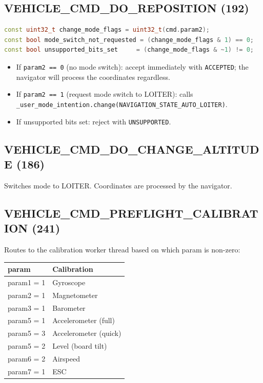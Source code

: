 \documentclass[12pt,a4paper]{article}
\begin{document}
\subsection{VEHICLE\_CMD\_DO\_REPOSITION (192)}

\begin{lstlisting}[language=C++]
const uint32_t change_mode_flags = uint32_t(cmd.param2);
const bool mode_switch_not_requested = (change_mode_flags & 1) == 0;
const bool unsupported_bits_set     = (change_mode_flags & ~1) != 0;
\end{lstlisting}

\begin{itemize}
  \item If \texttt{param2 == 0} (no mode switch): accept immediately with
        \texttt{ACCEPTED}; the navigator will process the coordinates regardless.
  \item If \texttt{param2 == 1} (request mode switch to LOITER): calls
        \texttt{\_user\_mode\_intention.change(NAVIGATION\_STATE\_AUTO\_LOITER)}.
  \item If unsupported bits set: reject with \texttt{UNSUPPORTED}.
\end{itemize}

\subsection{VEHICLE\_CMD\_DO\_CHANGE\_ALTITUDE (186)}
Switches mode to LOITER. Coordinates are processed by the navigator.

\subsection{VEHICLE\_CMD\_PREFLIGHT\_CALIBRATION (241)}

Routes to the calibration worker thread based on which param is non-zero:
\begin{center}\begin{tabular}{ll}\toprule
param & Calibration \\\midrule
param1 = 1 & Gyroscope \\
param2 = 1 & Magnetometer \\
param3 = 1 & Barometer \\
param5 = 1 & Accelerometer (full) \\
param5 = 3 & Accelerometer (quick) \\
param5 = 2 & Level (board tilt) \\
param6 = 2 & Airspeed \\
param7 = 1 & ESC \\
\bottomrule\end{tabular}\end{center}
\end{document}
